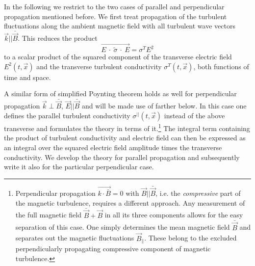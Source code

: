 \documentclass[ ]{copernicus2}
\begin{document}
{In the following we restrict to the two cases of parallel and perpendicular propagation mentioned before. We first treat propagation of the turbulent fluctuations along the ambient magnetic field with all turbulent wave vectors $\vec{k} || \bar{\vec{B}}$. This reduces the product 
\begin{equation}
\vec{E\ \cdot\ {\tilde\sigma}\ \cdot\ E}= \sigma^TE^2
\end{equation}
to a scalar product of the squared component of the transverse electric field $E^2(t, \vec{x})$ and the transverse turbulent conductivity $\sigma^T(t, \vec{x})$, both functions of time and space. 

{A similar form of simplified Poynting theorem holds as well for perpendicular propagation $\vec{k} \perp \bar{\vec{B}}$, $\vec{E} || \bar{\vec B}$ and will be made use of farther below. In this case one defines the parallel turbulent conductivity $\sigma^{||}(t, \vec{x})$ instead of the above transverse and formulates the theory in terms of it.\footnote{{Perpendicular propagation $\vec{k\cdot\bar{B}}=0$ with $\vec{B} || \bar{\vec{B}}$, i.e. the \emph{compressive} part of the magnetic turbulence, requires a different approach. Any measurement of the full magnetic field $\bar{\vec{B}}+\vec{B}$ in all its three components allows for the easy separation of this case. One simply determines the mean magnetic field $\bar{\vec{B}}$ and separates out the magnetic fluctuations $\vec{B}_\|$. These belong to the excluded perpendicularly propagating compressive component of magnetic turbulence.}} The integral term containing the product of turbulent conductivity and electric field can then be expressed as an integral over the squared electric field amplitude times the transverse conductivity. We develop the theory for parallel propagation and subsequently write it also for the particular perpendicular case.} 

}
\end{document}
